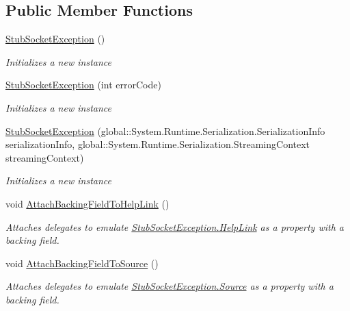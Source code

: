 \subsection*{Public Member Functions}
\begin{DoxyCompactItemize}
\item 
\hyperlink{class_system_1_1_net_1_1_sockets_1_1_fakes_1_1_stub_socket_exception_a55c5256078bea6493001fe1b1c9fa99d}{Stub\-Socket\-Exception} ()
\begin{DoxyCompactList}\small\item\em Initializes a new instance\end{DoxyCompactList}\item 
\hyperlink{class_system_1_1_net_1_1_sockets_1_1_fakes_1_1_stub_socket_exception_a6b620ce2a9efc337b6019b2ffcee554e}{Stub\-Socket\-Exception} (int error\-Code)
\begin{DoxyCompactList}\small\item\em Initializes a new instance\end{DoxyCompactList}\item 
\hyperlink{class_system_1_1_net_1_1_sockets_1_1_fakes_1_1_stub_socket_exception_afa73341a9eaf62fbb1728357fd68a16b}{Stub\-Socket\-Exception} (global\-::\-System.\-Runtime.\-Serialization.\-Serialization\-Info serialization\-Info, global\-::\-System.\-Runtime.\-Serialization.\-Streaming\-Context streaming\-Context)
\begin{DoxyCompactList}\small\item\em Initializes a new instance\end{DoxyCompactList}\item 
void \hyperlink{class_system_1_1_net_1_1_sockets_1_1_fakes_1_1_stub_socket_exception_a1f4443bc31d06ad6e2622280d563fe97}{Attach\-Backing\-Field\-To\-Help\-Link} ()
\begin{DoxyCompactList}\small\item\em Attaches delegates to emulate \hyperlink{class_system_1_1_net_1_1_sockets_1_1_fakes_1_1_stub_socket_exception_a723e5d25fe4f54c2d116152cd85edb24}{Stub\-Socket\-Exception.\-Help\-Link} as a property with a backing field.\end{DoxyCompactList}\item 
void \hyperlink{class_system_1_1_net_1_1_sockets_1_1_fakes_1_1_stub_socket_exception_a4328e9b2066272926f89e4ed6303a31d}{Attach\-Backing\-Field\-To\-Source} ()
\begin{DoxyCompactList}\small\item\em Attaches delegates to emulate \hyperlink{class_system_1_1_net_1_1_sockets_1_1_fakes_1_1_stub_socket_exception_aed6188fac6e26d9b603c20651af60c75}{Stub\-Socket\-Exception.\-Source} as a property with a backing field.\end{DoxyCompactList}\item 

\end{DoxyCompactItemize}
